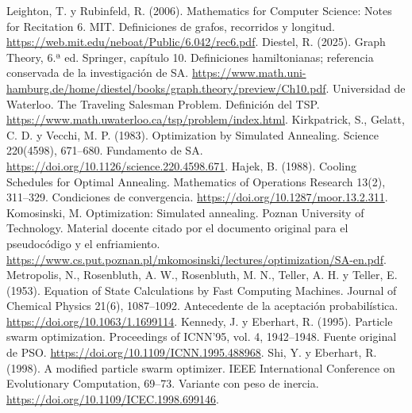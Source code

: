  Leighton, T. y Rubinfeld, R. (2006). Mathematics for Computer Science: Notes for Recitation 6. MIT. Definiciones de grafos, recorridos y longitud. \url{https://web.mit.edu/neboat/Public/6.042/rec6.pdf}.
 Diestel, R. (2025). Graph Theory, 6.ª ed. Springer, capítulo 10. Definiciones hamiltonianas; referencia conservada de la investigación de SA. \url{https://www.math.uni-hamburg.de/home/diestel/books/graph.theory/preview/Ch10.pdf}.
 Universidad de Waterloo. The Traveling Salesman Problem. Definición del TSP. \url{https://www.math.uwaterloo.ca/tsp/problem/index.html}.
 Kirkpatrick, S., Gelatt, C. D. y Vecchi, M. P. (1983). Optimization by Simulated Annealing. Science 220(4598), 671--680. Fundamento de SA. \url{https://doi.org/10.1126/science.220.4598.671}.
 Hajek, B. (1988). Cooling Schedules for Optimal Annealing. Mathematics of Operations Research 13(2), 311--329. Condiciones de convergencia. \url{https://doi.org/10.1287/moor.13.2.311}.
 Komosinski, M. Optimization: Simulated annealing. Poznan University of Technology. Material docente citado por el documento original para el pseudocódigo y el enfriamiento. \url{https://www.cs.put.poznan.pl/mkomosinski/lectures/optimization/SA-en.pdf}.
 Metropolis, N., Rosenbluth, A. W., Rosenbluth, M. N., Teller, A. H. y Teller, E. (1953). Equation of State Calculations by Fast Computing Machines. Journal of Chemical Physics 21(6), 1087--1092. Antecedente de la aceptación probabilística. \url{https://doi.org/10.1063/1.1699114}.
 Kennedy, J. y Eberhart, R. (1995). Particle swarm optimization. Proceedings of ICNN'95, vol. 4, 1942--1948. Fuente original de PSO. \url{https://doi.org/10.1109/ICNN.1995.488968}.
 Shi, Y. y Eberhart, R. (1998). A modified particle swarm optimizer. IEEE International Conference on Evolutionary Computation, 69--73. Variante con peso de inercia. \url{https://doi.org/10.1109/ICEC.1998.699146}.
